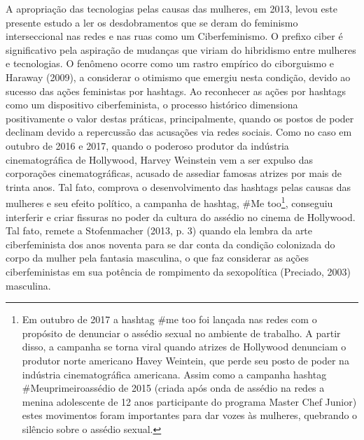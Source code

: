 A apropriação das tecnologias pelas causas das mulheres, em 2013, levou
este presente estudo a ler os desdobramentos que se deram do feminismo
interseccional nas redes e nas ruas como um Ciberfeminismo. O prefixo
ciber é significativo pela aspiração de mudanças que viriam do
hibridismo entre mulheres e tecnologias. O fenômeno ocorre como um
rastro empírico do ciborguismo e Haraway (2009), a considerar o otimismo
que emergiu nesta condição, devido ao sucesso das ações feministas por
hashtags. Ao reconhecer as ações por hashtags como um dispositivo
ciberfeminista, o processo histórico dimensiona positivamente o valor
destas práticas, principalmente, quando os postos de poder declinam
devido a repercussão das acusações via redes sociais. Como no caso em
outubro de 2016 e 2017, quando o poderoso produtor da indústria
cinematográfica de Hollywood, Harvey Weinstein vem a ser expulso das
corporações cinematográficas, acusado de assediar famosas atrizes por
mais de trinta anos. Tal fato, comprova o desenvolvimento das hashtags
pelas causas das mulheres e seu efeito político, a campanha de hashtag,
\#Me too\footnote{Em outubro de 2017 a hashtag \#me too foi lançada nas
  redes com o propósito de denunciar o assédio sexual no ambiente de
  trabalho. A partir disso, a campanha se torna viral quando atrizes de
  Hollywood denunciam o produtor norte americano Havey Weintein, que
  perde seu posto de poder na indústria cinematográfica americana. Assim
  como a campanha hashtag \#Meuprimeiroassédio de 2015 (criada após onda
  de assédio na redes a menina adolescente de 12 anos participante do
  programa Master Chef Junior) estes movimentos foram importantes para
  dar vozes às mulheres, quebrando o silêncio sobre o assédio sexual.},
conseguiu interferir e criar fissuras no poder da cultura do assédio no
cinema de Hollywood. Tal fato, remete a Stofenmacher (2013, p. 3) quando
ela lembra da arte ciberfeminista dos anos noventa para se dar conta da
condição colonizada do corpo da mulher pela fantasia masculina, o que
faz considerar as ações ciberfeministas em sua potência de rompimento da
sexopolítica (Preciado, 2003) masculina.

